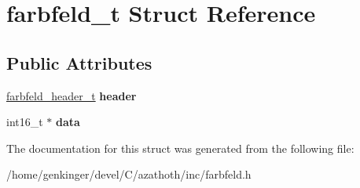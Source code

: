 \hypertarget{structfarbfeld__t}{}\section{farbfeld\+\_\+t Struct Reference}
\label{structfarbfeld__t}
\subsection*{Public Attributes}
\begin{DoxyCompactItemize}
\item 
\mbox{\label{structfarbfeld__t_aef2434436c9f9cf459d0b90011ce7d7e}} 
\mbox{\hyperlink{structfarbfeld__header__t}{farbfeld\+\_\+header\+\_\+t}} {\bfseries header}
\item 
\mbox{\label{structfarbfeld__t_a6288d264da362cf00af9f221b2382dc1}} 
int16\+\_\+t $\ast$ {\bfseries data}
\end{DoxyCompactItemize}


The documentation for this struct was generated from the following file\+:\begin{DoxyCompactItemize}
\item 
/home/genkinger/devel/\+C/azathoth/inc/farbfeld.\+h\end{DoxyCompactItemize}
